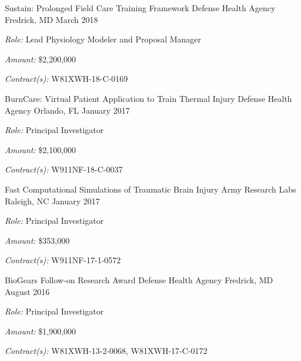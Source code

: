 
\begin{cventries}

  \cventry
    {Sustain: Prolonged Field Care Training Framework} %
    {Defense Health Agency} %
    {Fredrick, MD} %
    {March 2018} %
     {
     \begin{cvitems}
     \item{\textit{Role:} Lead Physiology Modeler and Proposal Manager}
     \item{\textit{Amount:} \$2,200,000}
     \item{\textit{Contract(s):} W81XWH-18-C-0169}
     \end{cvitems}
     }

  \cventry
    {BurnCare: Virtual Patient Application to Train Thermal Injury} %
    {Defense Health Agency} %
    {Orlando, FL} %
    {January 2017} %
     {
    \begin{cvitems}
     \item{\textit{Role:} Principal Investigator}
     \item{\textit{Amount:} \$2,100,000}
    \item{\textit{Contract(s):} W911NF-18-C-0037}
    \end{cvitems}
     }

  \cventry
    {Fast Computational Simulations of Traumatic Brain Injury} %
    {Army Research Labs} %
    {Raleigh, NC} %
    {January 2017} %
     {
     \begin{cvitems}
     \item{\textit{Role:} Principal Investigator}
     \item{\textit{Amount:} \$353,000}
    \item{\textit{Contract(s):} W911NF-17-1-0572}
     \end{cvitems}
     }

  \cventry
    {BioGears Follow-on Research Award} %
    {Defense Health Agency} %
    {Fredrick, MD} %
    {August 2016} %
     {
     \begin{cvitems}
     \item{\textit{Role:} Principal Investigator}
     \item{\textit{Amount:} \$1,900,000}
     \item{\textit{Contract(s):} W81XWH-13-2-0068, W81XWH-17-C-0172}
     \end{cvitems}
     }


\end{cventries}
